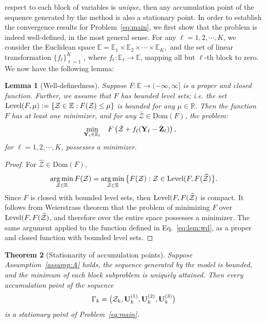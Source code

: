 \documentclass{article}
\newtheorem{theorem}{Theorem}
\newcommand{\T}{\mathcal}
\newcommand{\m}[1]{{\bf{#1}}}
\newcommand{\wh}[1]{{\widehat{#1}}}
\newcommand{\mb}[1]{{\mathbb{#1}}}
\newtheorem{lemma}[theorem]{Lemma}
\DeclareMathOperator*{\argmin}{arg\,min}
\begin{document}
respect to each block of variables is \emph{unique}, then any accumulation point of the sequence
generated by the method is also a stationary point. In order to establish the convergence results for Problem~\eqref{eq:main}, we first show that the problem is indeed well-defined, in the most general sense. For any $\ell=1,2,\cdots, K$, we consider the Euclidean space $\mb E=\mb E_1\times\mb E_2\times \cdots\times \mb E_K,$ and the set of linear transformation $\{f_\ell\}_{\ell=1}^K$ , where $f_\ell: \mb E_\ell\to \mb E$, mapping all but $\ell$-th block to zero. We now have the following lemma:
\begin{lemma}[Well-definedness]\label{lem:wd}
Suppose $F:\mb E\to (-\infty, \infty]$ is a proper and closed function. Further, we assume
that $F$ has bounded level sets; i.e. the set $\textup{Level}(F,\mu):=\{\T Z\in \mb E: F(\T Z)\le \mu\}$ is bounded for any $\mu \in \mb R$. Then the function $F$ has at least one minimizer, and for any $\bar{\T Z}\in \text{Dom}(F)$, the problem:
\begin{equation}
\label{eq:lem:wd}
\begin{aligned}
\min\limits_{ {\m Y}_\ell\in \mb E_\ell }&\quad F\left(\bar{\T Z}+f_\ell({\m Y}_\ell-\bar{\m Z}_\ell)\right),
\end{aligned}
\end{equation}
for $\ell=1,2,\cdots, K$, possesses a minimizer.
\end{lemma}

\begin{proof}
For $\wh{\T Z}\in \text{Dom}(F)$, 
\begin{equation}
    \argmin\limits_{\T Z\in \mb E} F(\T Z)= \argmin\limits_{\T Z\in \mb E} \big{\{}F(\T Z):\T Z\in \textup{Level}(F, F(\wh{\T Z})\big{\}}.
\end{equation}
Since $F$ is closed with bounded level sets, then $\textup{Level}(F, F(\wh{\T Z})$ is compact. It follows from Weierstrass theorem that the problem of minimizing $F$ over $\textup{Level}(F, F(\wh{\T Z})$, and therefore over the entire space possesses a minimizer. The same argument applied to the function defined in Eq.~\eqref{eq:lem:wd}, as a proper and closed function with
bounded level sets.
\end{proof}


\begin{theorem}[Stationarity of accumulation points]\label{thm:con}
	Suppose Assumption~\ref{assump:A} holds, the sequence generated by
	the model is bounded, and the minimum of each block subproblem
	is uniquely attained. Then every accumulation point of the sequence
	\[
	\Gamma_k=
	\bigl(\T Z_k,\m U_k^{(1)},\m U_k^{(2)},\m U_k^{(3)}\bigr)
	\]
	is a stationary point of Problem~\eqref{eq:main}.
\end{theorem}
\end{document}
